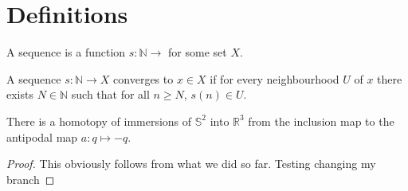 %



\section{Definitions}

\begin{definition}[Sequence]
  \label{def:sequence}
  A sequence is a function $s : ℕ → $ for some set $X$.
\end{definition}

\begin{definition}[Convergence]
  \label{def:convergence}

  A sequence $s : ℕ → X$ converges to $x ∈ X$ if for every neighbourhood $U$ of $x$ there exists
  $N ∈ ℕ$ such that for all $n ≥ N$, $s(n) ∈ U$.
\end{definition}


\begin{theorem}[Smale 1958]
  \label{thm:sphere_eversion}
  \leanok
  There is a homotopy of immersions of $𝕊^2$ into $ℝ^3$ from the inclusion map to
  the antipodal map $a : q ↦ -q$.
\end{theorem}
  
\begin{proof}
  \leanok
  This obviously follows from what we did so far. Testing changing my branch
\end{proof}